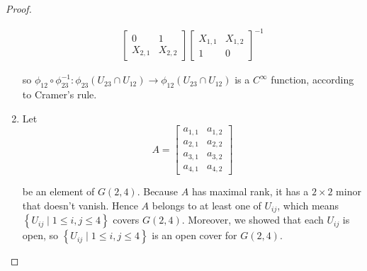 \begin{proof}
\begin{enumerate}[label={(\alph*)},leftmargin=*]
\begin{align*}
\begin{bmatrix}
                                                                                                                                                                                                 0       & 1       \\
                                                                                                                                                                                                 X_{2,1} & X_{2,2}
                                                                                                                                                                                             \end{bmatrix} {\begin{bmatrix}
                                                                                                                                                                                                                X_{1,1} & X_{1,2} \\
                                                                                                                                                                                                                1       & 0
                                                                                                                                                                                                            \end{bmatrix}}^{-1}
              \end{align*}
              \endgroup

              so \( \phi_{12} \circ \phi_{23}^{-1}: \phi_{23}(U_{23} \cap U_{12}) \to \phi_{12}(U_{23} \cap U_{12}) \) is a \( C^{\infty} \) function, according to Cramer's rule.
        \item Let
              \[
                  A = \begin{bmatrix}
                      a_{1,1} & a_{1,2} \\
                      a_{2,1} & a_{2,2} \\
                      a_{3,1} & a_{3,2} \\
                      a_{4,1} & a_{4,2}
                  \end{bmatrix}
              \]

              be an element of \( G(2, 4) \). Because \( A \) has maximal rank, it has a \( 2\times 2 \) minor that doesn't vanish. Hence \( A \) belongs to at least one of \( U_{ij} \), which means \( \left\{ U_{ij} \mid 1\leq i, j\leq 4 \right\} \) covers \( G(2, 4) \). Moreover, we showed that each \( U_{ij} \) is open, so  \( \left\{ U_{ij} \mid 1\leq i, j\leq 4 \right\} \) is an open cover for \( G(2, 4) \).


\end{enumerate}
\end{proof}
